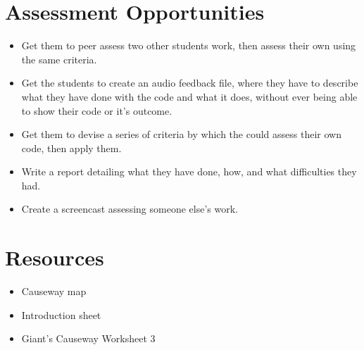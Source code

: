 \documentclass{geocraft-lesson-plan}
\begin{document}
\section*{Assessment Opportunities}
\begin{itemize}
\item Get them to peer assess two other students work, then assess their own using the same criteria.
\item Get the students to create an audio feedback file, where they have to describe what they have done with the code
  and what it does, without ever being able to show their code or it's outcome.
\item Get them to devise a series of criteria by which the could assess their own code, then apply them.
\item Write a report detailing what they have done, how, and what difficulties they had.
\item Create a screencast assessing someone else's work.
\end{itemize}

\section*{Resources}
\begin{itemize}
\item Causeway map
\item Introduction sheet 
\item Giant’s Causeway Worksheet 3
\end{itemize}
\end{document}
